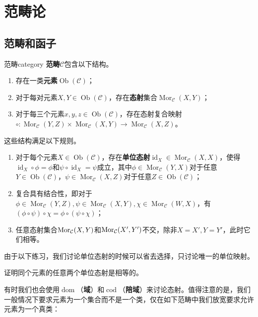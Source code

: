 \documentclass[../main.tex]{subfiles}
\begin{document}
\setcounter{chapter}{1}
\chapter{范畴论}\label{cha:category_theory}
\section{范畴和函子}
\begin{definition}{范畴}{category}
\textbf{范畴}$\mathcal{C}$包含以下结构。
\begin{enumerate}
    \item 存在一类\textbf{元素}$\operatorname{Ob}(\mathcal{C})$；
    \item 对于每对元素$X,Y\in\operatorname{Ob}(\mathcal{C})$，存在\textbf{态射}集合$\operatorname{Mor}_\mathcal{C}(X,Y)$；
    \item 对于每三个元素$x,y,z\in\operatorname{Ob}(\mathcal{C})$，存在态射复合映射${\circ}:\operatorname{Mor}_\mathcal{C}(Y,Z)\times\operatorname{Mor}_{\mathcal{C}}(X,Y)\to\operatorname{Mor}_\mathcal{C}(X,Z)$。
\end{enumerate}
这些结构满足以下规则。
\begin{enumerate}
    \item 对于每个元素$X\in\operatorname{Ob}(\mathcal{C})$，存在\textbf{单位态射}$\operatorname{id}_X\in\operatorname{Mor}_\mathcal{C}(X,X)$，使得$\operatorname{id}_X\circ\phi=\phi$和$\psi\circ\operatorname{id}_X=\psi$成立，其中$\phi\in\operatorname{Mor}_\mathcal{C}(Y,X)$对于任意$Y\in\operatorname{Ob}(\mathcal{C})$，$\psi\in\operatorname{Mor}_\mathcal{C}(X,Z)$对于任意$Z\in\operatorname{Ob}(\mathcal{C})$；
    \item 复合具有结合性，即对于$\phi\in\operatorname{Mor}_\mathcal{C}(Y,Z),\psi\in\operatorname{Mor}_\mathcal{C}(X,Y),\chi\in\operatorname{Mor}_\mathcal{C}(W,X)$，有$(\phi\circ\psi)\circ\chi=\phi\circ(\psi\circ\chi)$；
    \item 任意态射集合$\operatorname{Mor}_\mathcal{C}(X,Y)$和$\operatorname{Mor}_\mathcal{C}(X',Y')$不交，除非$X=X',Y=Y'$，此时它们相等。
\end{enumerate}
\end{definition}
由于以下练习，我们讨论单位态射的时候可以省去选择，只讨论唯一的单位映射。
\begin{exercise}{}
证明同个元素的任意两个单位态射是相等的。
\end{exercise}
有时我们也会使用$\operatorname{dom}$（\textbf{域}）和$\operatorname{cod}$（\textbf{陪域}）来讨论态射。值得注意的是，我们一般情况下要求元素为一个集合而不是一个类，仅在如下范畴中我们放宽要求允许元素为一个真类：
\end{document}
